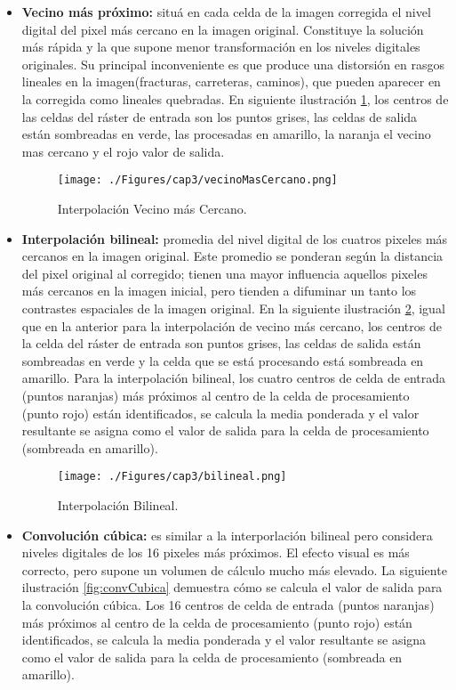 	\begin{itemize}
		\item \textbf{Vecino m\'as pr\'oximo:} situ\'a en cada celda de la imagen corregida el nivel digital del pixel m\'as cercano en la imagen original. Constituye la soluci\'on m\'as r\'apida y la que supone menor transformaci\'on en los niveles digitales originales. Su principal inconveniente es que produce una distorsi\'on en rasgos lineales en la imagen(fracturas, carreteras, caminos), que pueden aparecer en la corregida como lineales quebradas. En siguiente ilustraci\'on \ref{fig:vecinoMasCercano}, los centros de las celdas del r\'aster de entrada son los puntos grises, las celdas de salida est\'an sombreadas en verde, las procesadas en amarillo, la naranja el vecino mas cercano y el rojo valor de salida.
		    \begin{figure}[H]
		    	\centering
		    	\texttt{[image: ./Figures/cap3/vecinoMasCercano.png]}
		    	\caption{Interpolaci\'on Vecino m\'as Cercano.}
		    	\label{fig:vecinoMasCercano}
		    \end{figure}
		\item \textbf{Interpolaci\'on bilineal:} promedia del nivel digital de los cuatros pixeles m\'as cercanos en la imagen original. Este promedio se ponderan seg\'un la distancia del pixel original al corregido; tienen una mayor influencia aquellos pixeles m\'as cercanos en la imagen inicial, pero tienden a difuminar un tanto los contrastes espaciales de la imagen original. En la siguiente ilustraci\'on \ref{fig:bilineal}, igual que en la anterior para la interpolaci\'on de vecino m\'as cercano, los centros de la celda del r\'aster de entrada son puntos grises, las celdas de salida est\'an sombreadas en verde y la celda que se est\'a procesando est\'a sombreada en amarillo. Para la interpolaci\'on bilineal, los cuatro centros de celda de entrada (puntos naranjas) m\'as pr\'oximos al centro de la celda de procesamiento (punto rojo) est\'an identificados, se calcula la media ponderada y el valor resultante se asigna como el valor de salida para la celda de procesamiento (sombreada en amarillo).
		    \begin{figure}[H]
		    	\centering
		    	\texttt{[image: ./Figures/cap3/bilineal.png]}
		    	\caption{Interpolaci\'on Bilineal.}
		    	\label{fig:bilineal}
		    \end{figure}
		\item \textbf{Convoluci\'on c\'ubica:} es similar a la interporlaci\'on bilineal pero considera niveles digitales de los 16 pixeles m\'as pr\'oximos. El efecto visual es m\'as correcto, pero supone un volumen de c\'alculo mucho m\'as elevado. La siguiente ilustraci\'on \ref{fig:convCubica} demuestra c\'omo se calcula el valor de salida para la convoluci\'on c\'ubica. Los 16 centros de celda de entrada (puntos naranjas) m\'as pr\'oximos al centro de la celda de procesamiento (punto rojo) est\'an identificados, se calcula la media ponderada y el valor resultante se asigna como el valor de salida para la celda de procesamiento (sombreada en amarillo).

\end{itemize}
